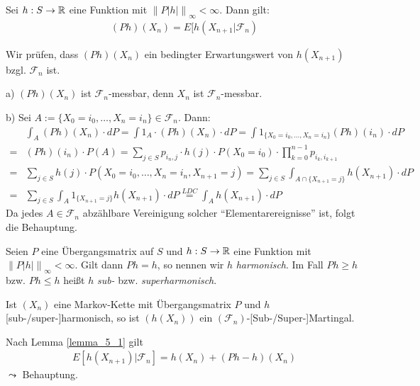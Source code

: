 \documentclass[a4paper,twoside,DIV15,BCOR12mm]{scrbook}
\newcommand{\cF}{\mathcal F}
\begin{document}
\begin{lemma}
  \label{lemma_5_1}
  Sei $h: S \rightarrow \mathbb{R}$ eine Funktion mit $\left\|P \left|h\right| \right\|_\infty < \infty$. Dann gilt:
  \begin{align*}
    (Ph)(X_n) = E[h(X_{n+1}|\cF_n)
  \end{align*}
\end{lemma}
\begin{beweis}
  Wir prüfen, dass $(Ph)(X_n)$ ein bedingter Erwartungswert von $h(X_{n+1})$ bzgl. $\cF_n$ ist.

  a) $(Ph)(X_n)$ ist $\cF_n$-messbar, denn $X_n$ ist $\cF_n$-messbar.

  b) Sei $A := \{X_0 = i_0, \ldots, X_n = i_n\} \in \cF_n$. Dann:
  \begin{align*}
      &\int_A (Ph)(X_n) \cdot dP = \int 1_A \cdot (Ph)(X_n) \cdot dP = \int 1_{\{X_0 = i_0, \ldots, X_n = i_n\}} (Ph)(i_n) \cdot dP\\
    = &(Ph)(i_n) \cdot P(A) = \sum_{j \in S} p_{i_n,j} \cdot h(j) \cdot P(X_0 = i_0) \cdot \prod_{k=0}^{n-1} p_{i_k,i_{k+1}}\\
    = &\sum_{j \in S} h(j) \cdot P(X_0 = i_0, \ldots, X_n = i_n, X_{n+1} = j) = \sum_{j \in S} \int_{A \cap \{X_{n+1} = j\}} h(X_{n+1}) \cdot dP\\
    = &\sum_{j \in S} \int_A 1_{\{X_{n+1} = j\}} h(X_{n+1}) \cdot dP \stackrel{LDC}{=} \int_A h(X_{n+1}) \cdot dP
  \end{align*}
  Da jedes $A \in \cF_n$ abzählbare Vereinigung solcher ``Elementarereignisse'' ist, folgt die Behauptung.
\end{beweis}

\begin{satzunddefinition}
  Seien $P$ eine Übergangsmatrix auf $S$ und $h: S \rightarrow \mathbb{R}$ eine Funktion mit $\left\|P \left|h\right| \right\|_\infty < \infty$. Gilt
  dann $Ph = h$, so nennen wir $h$ \emph{harmonisch}. Im Fall $Ph \geq h$ bzw. $Ph \leq h$ heißt $h$ \emph{sub-} bzw. \emph{superharmonisch}.

  Ist $(X_n)$ eine Markov-Kette mit Übergangsmatrix $P$ und $h$ [sub-/super-]harmonisch, so ist $(h(X_n))$ ein $(\cF_n)$-[Sub-/Super-]Martingal.
\end{satzunddefinition}
\begin{beweis}
  Nach Lemma \ref{lemma_5_1} gilt
  \begin{align*}
    E[h(X_{n+1})|\cF_n] = h(X_n) + (Ph - h)(X_n)
  \end{align*}
  $\leadsto$ Behauptung.
\end{beweis}
\end{document}
